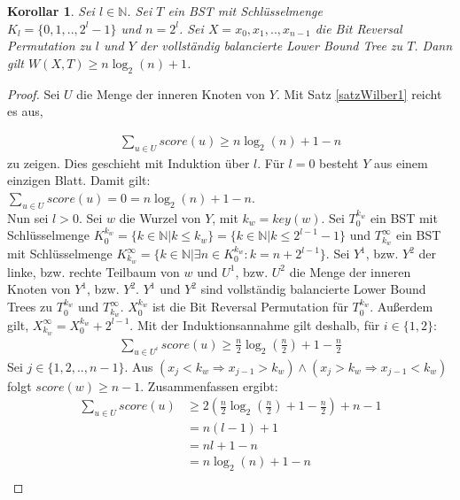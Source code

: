 \documentclass[a4paper,12pt]{article}
\begin{document}
\newtheorem{Korollar1}{Korollar}[section]
\begin{Korollar1} Sei $l \in \mathbb{N}$. Sei $T$ ein BST mit Schlüsselmenge\\ ${K_l = \{0,1,..,2^l -1\}}$ und $n = 2^l$. Sei $X = x_0, x_1,..,x_{n-1}$ die Bit Reversal Permutation zu $l$ und $Y$ der vollständig balancierte Lower Bound Tree zu $T$. Dann gilt  $W\left(X,T\right) \geq n \log_2 \left(n\right) + 1 $. 
\end{Korollar1}
\begin{proof}
	Sei $U$ die Menge der inneren Knoten von $Y$. Mit Satz \ref{satzWilber1} reicht es aus, 
	
	\begin{align*}
	\sum_{u \in U} {\mathit{score}\left(u\right)} \geq n \log_2\left( n\right) + 1 - n 
	\end{align*} 
	zu zeigen. Dies geschieht mit Induktion über $l$. Für $l = 0$ besteht $Y$ aus einem einzigen Blatt. Damit gilt:\\ $ \sum_{u \in U} {\mathit{score}\left(u\right)} = 0 = n \log_2 \left(n\right) + 1 - n $. \\
	Nun sei $l > 0$. Sei $w$ die Wurzel von $Y$, mit $k_w = \mathit{key}(w)$. Sei $T_0^{k_w}$ ein BST mit Schlüsselmenge $K_0^{k_w} =\{k \in \mathbb{N}\vert k \leq k_w\} = \{k \in \mathbb{N}\vert k \leq 2^{l-1} - 1\}$ und $T_{k_w}^\infty$ ein BST mit Schlüsselmenge  $ K^\infty_{k_w} = \{k \in \mathbb{N}\vert \exists n \in K_0^{k_w}\colon  k = n + 2^{l-1}\}$. Sei $Y^1$, bzw. $Y^2$ der linke, bzw. rechte Teilbaum von $w$ und $U^1$, bzw. $U^2$ die Menge der inneren Knoten von $Y^1$, bzw. $Y^2$. $Y^1$ und $Y^2$ sind vollständig balancierte Lower Bound Trees zu $T_0^{k_w}$ und $T_{k_w}^\infty$. $X^{k_w}_0$ ist die Bit Reversal Permutation für $T_0^{k_w}$. Außerdem gilt, $X_{k_w}^\infty = X^{k_w}_0 + 2^{l-1}$. Mit der Induktionsannahme gilt deshalb, für $i \in \{1,2\}$:
	\begin{align*}
	\sum_{u \in U^i} {\mathit{score}\left(u\right)} \geq  \frac{n}{2} \log_2 \left(\frac{n}{2} \right) + 1 - \frac{n}{2}  
	\end{align*}
	Sei $j \in \{1, 2,.., n-1\}$. Aus $\left(x_j < k_w \Rightarrow x_{j-1} > k_w \right) \land \left(x_j > k_w \Rightarrow x_{j-1} < k_w \right)$ folgt $\mathit{score}\left(w\right) \geq n-1$. Zusammenfassen ergibt:
	\begin{align*}
	\sum_{u \in U} {\mathit{score}\left(u\right)} &\geq 2 \left( \frac{n}{2}  \log_2 \left(\frac{n}{2} \right) + 1 - \frac{n}{2} \right) + n - 1\\	
	&= n (l-1)  + 1 \\	
	&= n l + 1 -n \\
	&= n \log_2\left( n\right) + 1 - n\\	
	\end{align*}
	
\end{proof}
\end{document}
